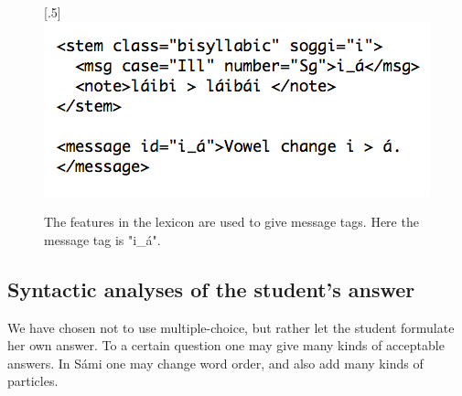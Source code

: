 \documentclass[11pt]{article}
\begin{document}
\begin{figure}[htbp]
\begin{center}
\scalebox{.5}[.5]{\includegraphics{presentation/img/morphfeedbackEng.png}}\\
\caption{The features in the lexicon are used to give message tags. Here the message tag is "i\_á".}
\label{feedbacknouns}
\end{center}
\end{figure}

%

\subsection{Syntactic analyses of the student's answer} \label{sentencefeedback}
We have chosen not to use multiple-choice, but rather let the student formulate her own answer. To a certain question one may give many kinds of acceptable answers. In Sámi one may change word order, and also add many kinds of particles. 
\end{document}
